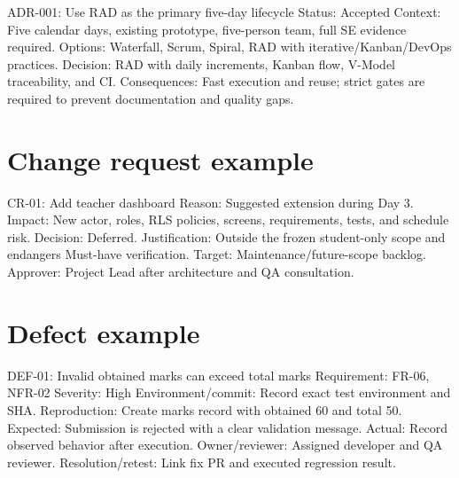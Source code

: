 \documentclass[
  10pt,
  a4paper,
  oneside]{report}
\newenvironment{Shaded}{}{}
\newcommand{\NormalTok}[1]{#1}
\begin{document}
\begin{Shaded}
\begin{Highlighting}[]
\NormalTok{ADR{-}001: Use RAD as the primary five{-}day lifecycle}
\NormalTok{Status: Accepted}
\NormalTok{Context: Five calendar days, existing prototype, five{-}person team, full SE evidence required.}
\NormalTok{Options: Waterfall, Scrum, Spiral, RAD with iterative/Kanban/DevOps practices.}
\NormalTok{Decision: RAD with daily increments, Kanban flow, V{-}Model traceability, and CI.}
\NormalTok{Consequences: Fast execution and reuse; strict gates are required to prevent documentation and quality gaps.}
\end{Highlighting}
\end{Shaded}

\section{Change request example}\label{284-change-request-example}

\begin{Shaded}
\begin{Highlighting}[]
\NormalTok{CR{-}01: Add teacher dashboard}
\NormalTok{Reason: Suggested extension during Day 3.}
\NormalTok{Impact: New actor, roles, RLS policies, screens, requirements, tests, and schedule risk.}
\NormalTok{Decision: Deferred.}
\NormalTok{Justification: Outside the frozen student{-}only scope and endangers Must{-}have verification.}
\NormalTok{Target: Maintenance/future{-}scope backlog.}
\NormalTok{Approver: Project Lead after architecture and QA consultation.}
\end{Highlighting}
\end{Shaded}

\section{Defect example}\label{285-defect-example}

\begin{Shaded}
\begin{Highlighting}[]
\NormalTok{DEF{-}01: Invalid obtained marks can exceed total marks}
\NormalTok{Requirement: FR{-}06, NFR{-}02}
\NormalTok{Severity: High}
\NormalTok{Environment/commit: Record exact test environment and SHA.}
\NormalTok{Reproduction: Create marks record with obtained 60 and total 50.}
\NormalTok{Expected: Submission is rejected with a clear validation message.}
\NormalTok{Actual: Record observed behavior after execution.}
\NormalTok{Owner/reviewer: Assigned developer and QA reviewer.}
\NormalTok{Resolution/retest: Link fix PR and executed regression result.}
\end{Highlighting}
\end{Shaded}
\end{document}
